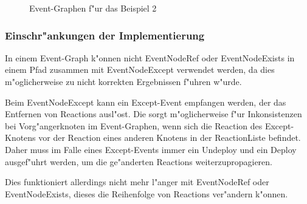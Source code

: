 \begin{figure}[htp]
\centering
{}
\caption{Event-Graphen f"ur das Beispiel 2}
\end{figure}


\subsubsection{Einschr"ankungen der Implementierung}
In einem Event-Graph k"onnen nicht EventNodeRef oder EventNodeExists in einem
Pfad zusammen mit EventNodeExcept verwendet werden, da dies m"oglicherweise zu
nicht korrekten Ergebnissen f"uhren w"urde.

Beim EventNodeExcept kann ein Except-Event empfangen werden, der das Entfernen
von Reactions ausl"ost. Die sorgt m"oglicherweise f"ur Inkonsistenzen
bei Vorg"angerknoten im Event-Graphen, wenn sich die Reaction des Except-Knotens
vor der Reaction eines anderen Knotens in der ReactionListe befindet.
Daher muss im Falle eines Except-Events immer ein Undeploy und ein Deploy
ausgef"uhrt  werden, um die ge"anderten Reactions weiterzupropagieren.

Dies funktioniert allerdings nicht mehr l"anger mit EventNodeRef oder
EventNodeExists, dieses die Reihenfolge von Reactions ver"andern k"onnen.
